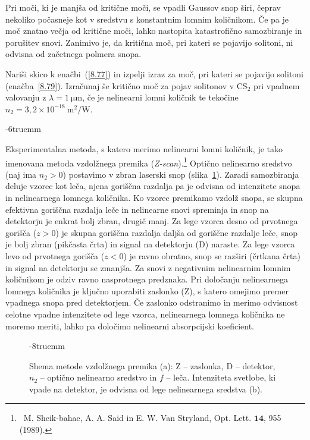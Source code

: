 Pri moči, ki je manjša od kritične moči, se vpadli Gaussov snop širi, 
čeprav nekoliko počasneje kot v sredstvu s konstantnim lomnim količnikom. 
Če pa je moč znatno večja od kritične moči, lahko
nastopita katastrofično samozbiranje in porušitev snovi.
Zanimivo je, da kritična moč, pri kateri se pojavijo solitoni, 
ni odvisna od začetnega polmera snopa.

\begin{naloga}
Nariši skico k enačbi~(\ref{8.77}) in izpelji izraz za moč, pri kateri se pojavijo
solitoni (enačba~\ref{8.79}). 
Izračunaj še kritično moč za pojav solitonov v CS$_{2}$ pri
vpadnem valovanju z $\lambda = 1~\si{\micro\metre}$, če je 
nelinearni lomni količnik te tekočine
 $n_{2}=3,2 \times 10^{-18}~\si{\metre^2/\watt}$. 
\end{naloga}
\vglue-6truemm
\begin{remark}
Eksperimentalna metoda, 
s katero merimo nelinearni 
lomni količnik, je tako imenovana
metoda vzdolžnega premika ({\it Z-scan}).\footnote{~M. Sheik-bahae, A. A. Said in E. W. Van Stryland, 
Opt. Lett. $\mathbf{14}$, 955 (1989).} 
Optično nelinearno sredstvo (naj ima $n_2>0$)
postavimo v zbran laserski snop (slika~\ref{fig:zscan}). 
Zaradi samozbiranja deluje vzorec kot leča, njena goriščna razdalja
pa je odvisna od intenzitete snopa in nelinearnega lomnega količnika. Ko vzorec 
premikamo vzdolž snopa, se skupna efektivna goriščna razdalja leče in nelinearne snovi 
spreminja in snop na detektorju je enkrat bolj zbran, drugič manj. 
Za lege vzorca desno od prvotnega gorišča ($z>0$) je skupna goriščna
razdalja daljša od goriščne razdalje leče, snop je bolj zbran (pikčasta črta) in signal 
na detektorju (D) naraste. Za lege vzorca levo
od prvotnega gorišča ($z<0$) je ravno obratno, snop se razširi (črtkana črta) in 
signal na detektorju se zmanjša. Za snovi z negativnim nelinearnim lomnim količnikom
je odziv ravno nasprotnega predznaka. Pri določanju nelinearnega lomnega količnika je
ključno uporabiti zaslonko (Z), s katero omejimo premer vpadnega snopa pred detektorjem. 
Če zaslonko odstranimo in merimo 
odvisnost celotne vpadne intenzitete od lege vzorca, nelinearnega lomnega količnika 
ne moremo meriti, lahko pa določimo nelinearni absorpcijski koeficient. 
\begin{figure}[ht]
\raggedleft 
\def\svgwidth{118truemm} 

\captionsetup{width=0.82\textwidth}
\caption{Shema metode vzdolžnega premika (a): Z -- zaslonka, D -- detektor, $n_2$ -- optično
nelinearno sredstvo in $f$ -- leča. Intenziteta svetlobe, ki vpade na detektor, je odvisna
od lege nelinearnega sredstva (b).}
\label{fig:zscan}
\vglue-8truemm
\end{figure}
\end{remark}

